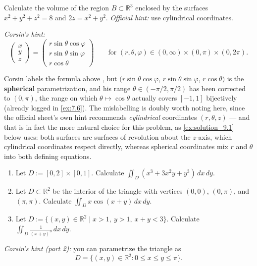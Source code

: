 \begin{exercise}
\label{ex:9.1}
Calculate the volume of the region $B \subset \mathbb{R}^3$ enclosed by the surfaces
$x^2+y^2+z^2=8$ and $2z=x^2+y^2$. \textit{Official hint:} use cylindrical coordinates.

\textit{Corsin's hint:}
\[\begin{pmatrix} x \\ y \\ z\end{pmatrix} = \begin{pmatrix} r\sin\theta\cos\varphi \\
  r\sin\theta\sin\varphi \\ r\cos\theta \end{pmatrix}
  \qquad \text{for } (r,\theta,\varphi) \in (0,\infty)\times(0,\pi)\times(0,2\pi).\]
\end{exercise}

\begin{ainote}
Corsin labels the formula above , but $(r\sin\theta\cos\varphi$, $r\sin\theta\sin\varphi$, $r\cos\theta)$ is the \textbf{spherical} parametrization, and his
range $\theta \in (-\pi/2,\pi/2)$ has been corrected to $(0,\pi)$, the range on which
$\theta \mapsto \cos\theta$ actually covers $[-1,1]$ bijectively (already logged in \cref{ex:7.6}). The mislabelling is doubly worth noting here, since the official sheet's own hint
recommends \emph{cylindrical} coordinates $(r,\theta,z)$ --- and that is in fact the more
natural choice for this problem, as \cref{ex:solution_9.1} below uses: both surfaces are
surfaces of revolution about the $z$-axis, which cylindrical coordinates respect directly,
whereas spherical coordinates mix $r$ and $\theta$ into both defining equations.
\end{ainote}

\begin{exercise}
\label{ex:9.2}
\begin{enumerate}[label=\textbf{\arabic*.}]
  \item Let $D := [0,2]\times[0,1]$. Calculate $\displaystyle\iint_D (x^3+3x^2y+y^3)\,dx\,dy$.
  \item Let $D \subset \mathbb{R}^2$ be the interior of the triangle with vertices $(0,0)$,
    $(0,\pi)$, and $(\pi,\pi)$. Calculate $\displaystyle\iint_D x\cos(x+y)\,dx\,dy$.
  \item Let $D := \{(x,y)\in\mathbb{R}^2 \mid x>1,\ y>1,\ x+y<3\}$. Calculate
    $\displaystyle\iint_D \frac{1}{(x+y)^3}\,dx\,dy$.
\end{enumerate}

\textit{Corsin's hint (part 2):} you can parametrize the triangle as
\[D = \{(x,y)\in\mathbb{R}^2 : 0 \leq x \leq y \leq \pi\}.\]
\end{exercise}

